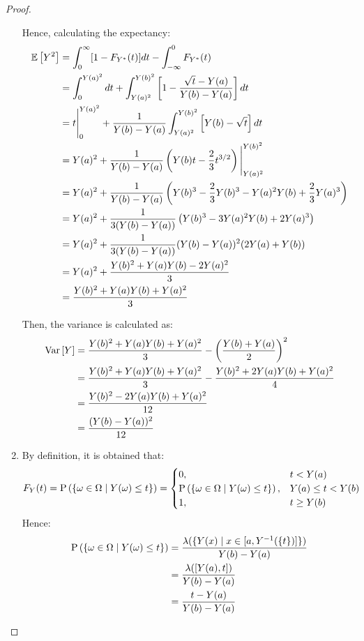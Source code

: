 \documentclass[11pt]{article}
\theoremstyle{definition}
\theoremstyle{remark}
\theoremstyle{remark}
\begin{document}
\begin{proof}
\begin{enumerate}[label=\alph*)]
      Hence, calculating the expectancy:
      \begin{align*}
        \E{Y^2} &= \int_0^\infty [1 - F_{Y^*}(t)]dt
                  - \int_{-\infty}^0 F_{Y^*}(t) \\
                &= \int_0^{Y(a)^2}dt + \int_{Y(a)^2}^{Y(b)^2}
                  \left[1 - \frac{\sqrt{t} - Y(a)}{Y(b) - Y(a)}\right] dt \\
                &= t \Bigg\rvert_0^{Y(a)^2} +
                  \frac{1}{Y(b) - Y(a)}\int_{Y(a)^2}^{Y(b)^2}\left[Y(b) - \sqrt{t}\right] dt \\
                &= Y(a)^2 + \frac{1}{Y(b) - Y(a)} \left(Y(b)t - \frac{2}{3} t^{3/2} \right)
                  \Bigg\rvert_{Y(a)^2}^{Y(b)^2} \\
                &= Y(a)^2 + \frac{1}{Y(b)-Y(a)} \left(Y(b)^3 - \frac{2}{3} Y(b)^3
                  - Y(a)^2Y(b) + \frac{2}{3}Y(a)^3\right) \\
                &= Y(a)^2 + \frac{1}{3(Y(b) - Y(a))} \left(Y(b)^3 - 3Y(a)^2Y(b) + 2Y(a)^3\right) \\
                &= Y(a)^2 + \frac{1}{3(Y(b) - Y(a))}(Y(b) - Y(a))^2(2Y(a) + Y(b)) \\
                &= Y(a)^2 + \frac{Y(b)^2 + Y(a)Y(b) - 2Y(a)^2}{3} \\
                &= \frac{Y(b)^2 + Y(a)Y(b) + Y(a)^2}{3}
      \end{align*}

      Then, the variance is calculated as:
      \begin{align*}
        \V{Y}
        &= \frac{Y(b)^2 + Y(a)Y(b) + Y(a)^2}{3} - \left(\frac{Y(b) + Y(a)}{2}\right)^2 \\
        &= \frac{Y(b)^2 + Y(a)Y(b) + Y(a)^2}{3} - \frac{Y(b)^2 + 2Y(a)Y(b) + Y(a)^2}{4} \\
        &= \frac{Y(b)^2 -2Y(a)Y(b) + Y(a)^2}{12} \\
        &= \frac{(Y(b) - Y(a))^2}{12}
      \end{align*}

    \item \label{item:acc5} By definition, it is obtained that:
      \begin{equation*}
        F_Y(t) = \P{\{\omega \in \Omega \mid Y(\omega) \le t\}} =
        \begin{cases}
          0, &t < Y(a) \\
          \P{\{\omega \in \Omega \mid Y(\omega) \le t\}}, &Y(a) \le t < Y(b) \\
          1, &t \ge Y(b)
        \end{cases}
      \end{equation*}
      Hence:
      \begin{align*}
        \P{\{\omega \in \Omega \mid Y(\omega) \le t\}}
        &= \frac{\lambda(\{ Y(x) \mid x \in [a, Y^{-1}(\{t\})]\})}{Y(b) - Y(a)} \\
        &= \frac{\lambda([Y(a), t])}{Y(b) - Y(a)} \\
        &= \frac{t - Y(a)}{Y(b) - Y(a)}
      \end{align*}


\end{enumerate}
\end{proof}
\end{document}
